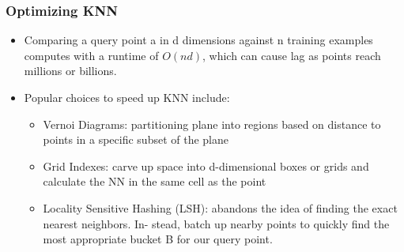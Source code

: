 \begin{frame}[fragile]\frametitle{Optimizing KNN}
\begin{itemize}
\item  Comparing a query point a in d dimensions against n training examples computes with a runtime of $O(nd)$, which can cause lag as points reach millions or billions. 
\item Popular choices to speed up KNN include:
\begin{itemize}
\item  Vernoi Diagrams: partitioning plane into regions
based on distance to points in a specific subset of
the plane
\item  Grid Indexes: carve up space into d-dimensional
boxes or grids and calculate the NN in the same cell
as the point
\item  Locality Sensitive Hashing (LSH): abandons
the idea of finding the exact nearest neighbors. In-
stead, batch up nearby points to quickly find the
most appropriate bucket B for our query point.
\end{itemize}
\end{itemize}
\end{frame}

%
%
%
%


